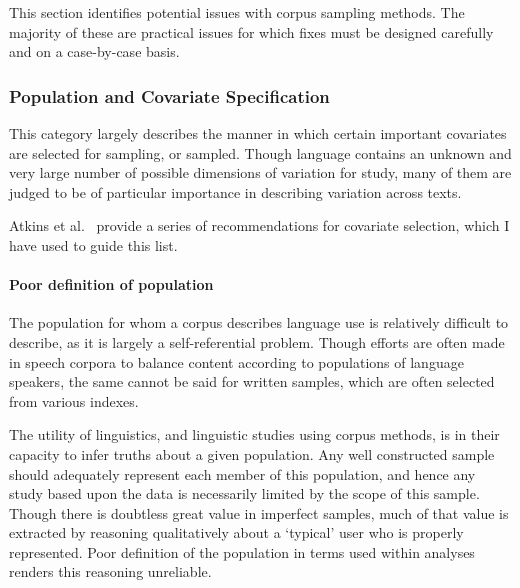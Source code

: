 This section identifies potential issues with corpus sampling methods.  The majority of these are practical issues for which fixes must be designed carefully and on a case-by-case basis.










\subsubsection{Population and Covariate Specification}
This category largely describes the manner in which certain important covariates are selected for sampling, or sampled. Though language contains an unknown and very large number of possible dimensions of variation for study, many of them are judged to be of particular importance in describing variation across texts.

Atkins et al.~\cite{atkins1992corpus} provide a series of recommendations for covariate selection, which I have used to guide this list.




\paragraph{Poor definition of population}
The population for whom a corpus describes language use is relatively difficult to describe, as it is largely a self-referential problem. Though efforts are often made in speech corpora to balance content according to populations of language speakers, the same cannot be said for written samples, which are often selected from various indexes.

The utility of linguistics, and linguistic studies using corpus methods, is in their capacity to infer truths about a given population. Any well constructed sample should adequately represent each member of this population, and hence any study based upon the data is necessarily limited by the scope of this sample. Though there is doubtless great value in imperfect samples, much of that value is extracted by reasoning qualitatively about a `typical' user who is properly represented. Poor definition of the population in terms used within analyses renders this reasoning unreliable.

